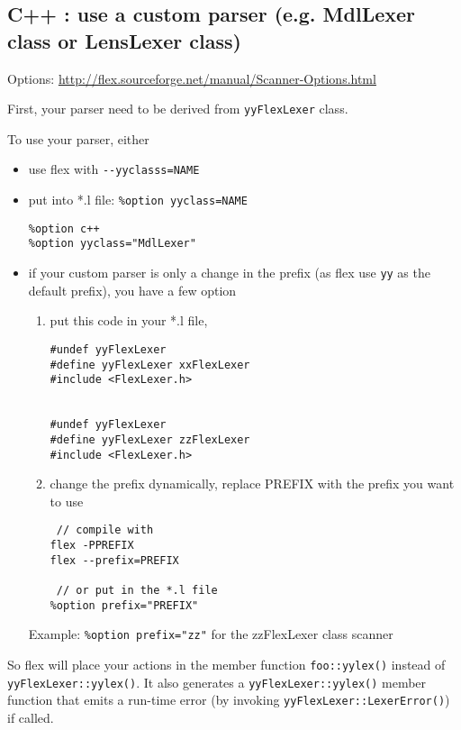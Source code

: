\subsection{C++ : use a custom parser (e.g. MdlLexer class or LensLexer class)}

Options: \url{http://flex.sourceforge.net/manual/Scanner-Options.html}

First, your parser need to be derived from \verb!yyFlexLexer! class.


To use your parser, either
\begin{itemize}
  \item use flex with \verb!--yyclasss=NAME!
  
  \item put into *.l file: \verb!%option yyclass=NAME!

\begin{verbatim}
%option c++
%option yyclass="MdlLexer"
\end{verbatim} 

  \item if your custom parser is only a change in the prefix (as flex use
  \verb!yy! as the default prefix), you have a few option
  
  \begin{enumerate}
    \item put this code in your *.l file,
  
  \begin{verbatim}
#undef yyFlexLexer
#define yyFlexLexer xxFlexLexer
#include <FlexLexer.h>


#undef yyFlexLexer
#define yyFlexLexer zzFlexLexer
#include <FlexLexer.h>
  \end{verbatim}
  
    \item change the prefix dynamically, replace PREFIX with the prefix you want
    to use
\begin{verbatim}
 // compile with 
flex -PPREFIX
flex --prefix=PREFIX

 // or put in the *.l file
%option prefix="PREFIX"
\end{verbatim}
    \end{enumerate}

Example: \verb!%option prefix="zz"! for the zzFlexLexer class scanner  
\end{itemize}

So flex will place your actions in the member function \verb!foo::yylex()!
instead of \verb!yyFlexLexer::yylex()!. It also generates a
\verb!yyFlexLexer::yylex()! member function that emits a run-time error (by
invoking \verb!yyFlexLexer::LexerError()!) if called.

